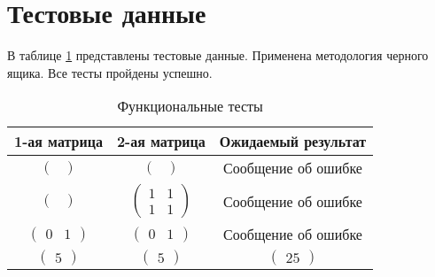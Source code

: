 \captionsetup{singlelinecheck = false, justification=raggedleft}



\section{Тестовые данные}

В таблице \ref{tbl:functional_test} представлены тестовые данные. Применена методология черного ящика. Все тесты пройдены успешно.

\begin{table}[ht!]
	\begin{center}
			\captionsetup{justification=raggedright,singlelinecheck=off}
			\caption{\label{tbl:functional_test} Функциональные тесты}
			\begin{tabular}{|c|c|c|}
				\hline
				1-ая матрица & 2-ая матрица & Ожидаемый результат 
				\\ \hline
				$\begin{pmatrix}
					\\
				\end{pmatrix}$ &
				$\begin{pmatrix}
					\\
				\end{pmatrix}$ &
				Сообщение об ошибке
				
				\\ \hline
				$\begin{pmatrix}
					\\
				\end{pmatrix}$ &
				$\begin{pmatrix}
					1 & 1\\
					1 & 1
				\end{pmatrix}$ &
				Сообщение об ошибке
				
				\\ \hline
				$\begin{pmatrix}
					0 & 1
				\end{pmatrix}$ &
				$\begin{pmatrix}
					0 & 1
				\end{pmatrix}$ &
				Сообщение об ошибке 
				
				\\ \hline
				$\begin{pmatrix}
					5
				\end{pmatrix}$ &
				$\begin{pmatrix}
					5
				\end{pmatrix}$ &
				$\begin{pmatrix}
					25
				\end{pmatrix}$
				

\end{tabular}
\end{center}
\end{table}
